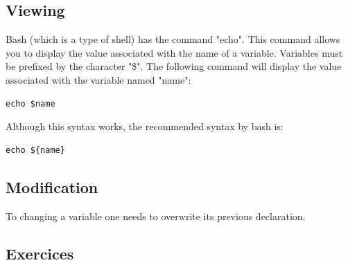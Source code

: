 \documentclass[11pt]{article}
\begin{document}
\subsection{Viewing}

Bash (which is a type of shell) has the command "echo". This command allows you to display the value associated with the name of a variable. Variables must be prefixed by the character "\$". The following command will display the value associated with the variable named "name":

\begin{lstlisting}
echo $name
\end{lstlisting}

Although this syntax works, the recommended syntax by bash is:

\begin{lstlisting}
echo ${name}
\end{lstlisting}

\subsection{Modification}

To changing a variable one needs to overwrite its previous declaration.

\subsection{Exercices}
\end{document}
